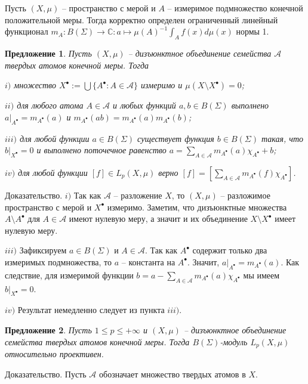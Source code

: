 \documentclass[12pt]{article}
\numberwithin{equation}{subsection}
\theoremstyle{plain}
\newtheorem{proposition}{Предложение}
\newenvironment{proof}{Доказательство.}{}
\begin{document}
\begin{fulltext}
    Пусть $(X,\mu)$ -- пространство с мерой и $A$ -- измеримое подмножество конечной положительной меры. Тогда корректно определен ограниченный линейный функционал $m_A:B(\Sigma)\to\mathbb{C}:a\mapsto \mu(A)^{-1}\int_A f(x)d\mu(x)$ нормы 1.

    \begin{proposition}\label{HardAtomicMeasProp} Пусть $(X,\mu)$ -- дизъюнктное объединение семейства $\mathcal{A}$ твердых атомов конечной меры. Тогда

        $i)$ множество $X^\bullet:=\bigcup \{A^\bullet:A\in\mathcal{A}\}$ измеримо и $\mu(X\setminus X^\bullet)=0$;

        $ii)$ для любого атома $A\in\mathcal{A}$ и любых функций $a,b\in B(\Sigma)$ выполнено $a|_{A^\bullet}=m_{A^\bullet}(a)$ и $m_{A^\bullet}(ab)=m_{A^\bullet}(a)m_{A^\bullet}(b)$;

        $iii)$ для любой функции $a\in B(\Sigma)$ существует функция $b\in B(\Sigma)$ такая, что $b|_{X^\bullet}=0$ и выполнено поточечное равенство $a=\sum_{A\in\mathcal{A}} m_{A^\bullet}(a)\chi_{A^\bullet} + b$;

        $iv)$ для любой функции $[f]\in L_p(X,\mu)$ верно $[f]=[\sum_{A\in\mathcal{A}} m_{A^\bullet}(f)\chi_{A^\bullet}]$.
    \end{proposition}
    \begin{proof} $i)$ Так как $\mathcal{A}$ -- разложение $X$, то $(X,\mu)$ -- разложимое пространство с мерой и $X^\bullet$ измеримо. Заметим, что дизъюнктные множества $A\setminus A^\bullet$ для $A\in\mathcal{A}$ имеют нулевую меру, а значит и их объединение $X\setminus X^\bullet$ имеет нулевую меру.

        $iii)$ Зафиксируем $a\in B(\Sigma)$ и $A\in \mathcal{A}$. Так как $A^\bullet$ содержит только два измеримых подмножества, то $a$ -- константа на $A^\bullet$. Значит, $a|_{A^\bullet}=m_{A^\bullet}(a)$. Как следствие, для измеримой функции $b=a-\sum_{A\in\mathcal{A}}m_{A^\bullet}(a)\chi_{A^\bullet}$ мы имеем $b|_{X^\bullet}=0$.

        $iv)$ Результат немедленно следует из пункта $iii)$.
    \end{proof}

    \begin{proposition}\label{LpBSigmaModSuffCond} Пусть $1\leq p\leq +\infty$ и $(X,\mu)$ -- дизъюнктное объединение семейства твердых атомов конечной меры. Тогда $B(\Sigma)$-модуль $L_p(X,\mu)$ относительно проективен.
    \end{proposition}
    \begin{proof} Пусть $\mathcal{A}$ обозначает множество твердых атомов в $X$.


\end{proof}
\end{fulltext}
\end{document}

